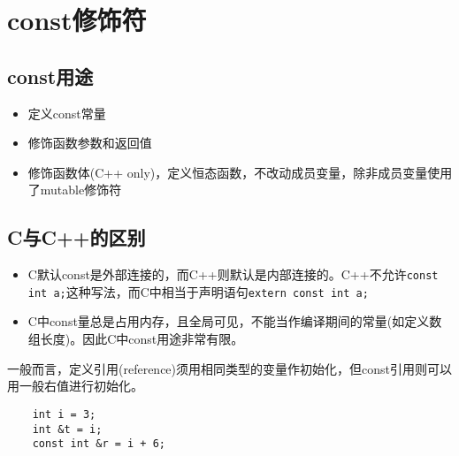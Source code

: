 \section{const修饰符}
\subsection{const用途}
\begin{itemize}
    \item 定义const常量
    \item 修饰函数参数和返回值
    \item 修饰函数体(C++ only)，定义恒态函数，不改动成员变量，除非成员变量使用了mutable修饰符
\end{itemize}

\subsection{C与C++的区别}
\begin{itemize}
    \item C默认const是外部连接的，而C++则默认是内部连接的。C++不允许\verb|const int a;|这种写法，而C中相当于声明语句\verb|extern const int a;|
    \item C中const量总是占用内存，且全局可见，不能当作编译期间的常量(如定义数组长度)。因此C中const用途非常有限。
\end{itemize}




一般而言，定义引用(reference)须用相同类型的变量作初始化，但const引用则可以用一般右值进行初始化。
\begin{lstlisting}
    int i = 3;
    int &t = i;
    const int &r = i + 6;
\end{lstlisting}
